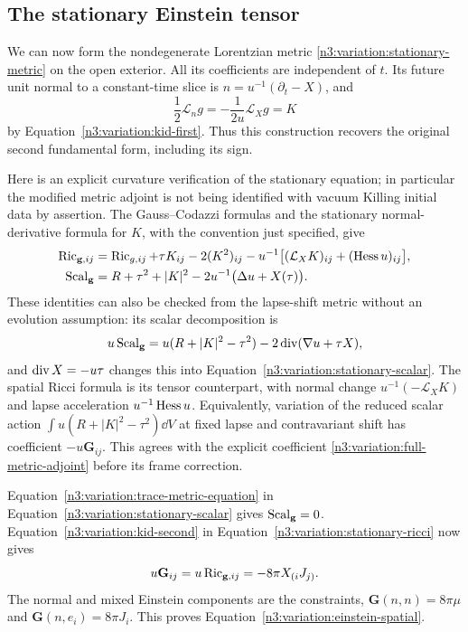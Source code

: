 \subsection{The stationary Einstein tensor}
\label{n3:variation:stationary-subsection}

We can now form the nondegenerate Lorentzian metric
\eqref{n3:variation:stationary-metric} on the open exterior.  All its
coefficients are independent of $t$.  Its future unit normal to a
constant-time slice is $n=u^{-1}(\partial_t-X)$, and
\[
 \frac12\mathcal L_n g
       =-\frac1{2u}\mathcal L_Xg=K
\]
by Equation~\eqref{n3:variation:kid-first}.  Thus this construction
recovers the original second fundamental form, including its sign.

Here is an explicit curvature verification of the stationary
equation; in particular the modified metric adjoint is not being
identified with vacuum Killing initial data by assertion.  The
Gauss--Codazzi formulas and the stationary normal-derivative formula
for $K$, with the convention just specified, give
\begin{align}
 \operatorname{Ric}_{\mathbf g,ij}
   &=\operatorname{Ric}_{g,ij}+\tau K_{ij}-2(K^2)_{ij}
       -u^{-1}\bigl[(\mathcal L_XK)_{ij}
                             +(\operatorname{Hess} u)_{ij}\bigr],
       \label{n3:variation:stationary-ricci}\\
 \operatorname{Scal}_{\mathbf g}
   &=R+\tau^2+|K|^2
             -2u^{-1}\bigl(\Delta u+X(\tau)\bigr).
       \label{n3:variation:stationary-scalar}
\end{align}
These identities can also be checked from the lapse-shift metric
without an evolution assumption: its scalar decomposition is
\[
 u\operatorname{Scal}_{\mathbf g}
  =u(R+|K|^2-\tau^2)
            -2\operatorname{div}(\nabla u+\tau X),
\]
and $\operatorname{div} X=-u\tau$ changes this into
Equation~\eqref{n3:variation:stationary-scalar}.  The spatial Ricci
formula is its tensor counterpart, with normal change
$u^{-1}(-\mathcal L_XK)$ and lapse acceleration $u^{-1}\operatorname{Hess} u$.
Equivalently, variation of the reduced scalar action
$\int u(R+|K|^2-\tau^2)\dd V$ at fixed lapse and contravariant
shift has coefficient $-u\mathbf G_{ij}$.
This agrees with the explicit coefficient
\eqref{n3:variation:full-metric-adjoint} before its frame correction.

Equation~\eqref{n3:variation:trace-metric-equation} in
Equation~\eqref{n3:variation:stationary-scalar} gives
$\operatorname{Scal}_{\mathbf g}=0$.  Equation~\eqref{n3:variation:kid-second} in
Equation~\eqref{n3:variation:stationary-ricci} now gives
\[
 u\mathbf G_{ij}=u\operatorname{Ric}_{\mathbf g,ij}
                  =-8\pi X_{(i}J_{j)}.
\]
The normal and mixed Einstein components are the constraints,
$\mathbf G(n,n)=8\pi\mu$ and
$\mathbf G(n,e_i)=8\pi J_i$.  This proves
Equation~\eqref{n3:variation:einstein-spatial}.

